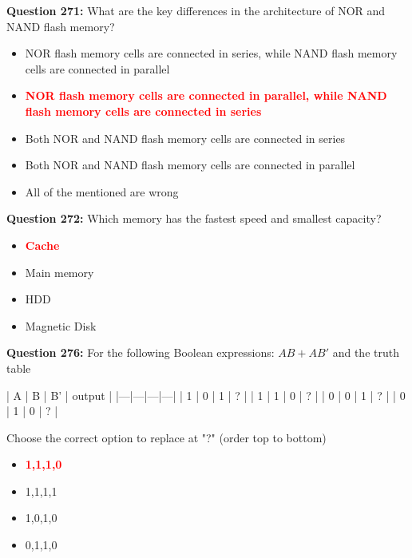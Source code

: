 \documentclass[12pt,a4paper]{article}
\begin{document}
\vspace{0.5cm}

\textbf{Question 271:} What are the key differences in the architecture of NOR and NAND flash memory?

\begin{itemize}
    \item[\textbf{A.}] NOR flash memory cells are connected in series, while NAND flash memory cells are connected in parallel
    \item[\textbf{B.}] \textcolor{red}{\textbf{NOR flash memory cells are connected in parallel, while NAND flash memory cells are connected in series}}
    \item[\textbf{C.}] Both NOR and NAND flash memory cells are connected in series
    \item[\textbf{D.}] Both NOR and NAND flash memory cells are connected in parallel
    \item[\textbf{E.}] All of the mentioned are wrong
\end{itemize}

\vspace{0.5cm}

\textbf{Question 272:} Which memory has the fastest speed and smallest capacity?

\begin{itemize}
    \item[\textbf{A.}] \textcolor{red}{\textbf{Cache}}
    \item[\textbf{B.}] Main memory
    \item[\textbf{C.}] HDD
    \item[\textbf{D.}] Magnetic Disk
\end{itemize}

\vspace{0.5cm}

\textbf{Question 276:} For the following Boolean expressions: $AB + AB'$ and the truth table

| A | B | B' | output |
|---|---|---|---|
| 1 | 0 | 1 | ? |
| 1 | 1 | 0 | ? |
| 0 | 0 | 1 | ? |
| 0 | 1 | 0 | ? |

Choose the correct option to replace at "?" (order top to bottom)

\begin{itemize}
    \item[\textbf{A.}] \textcolor{red}{\textbf{1,1,1,0}}
    \item[\textbf{B.}] 1,1,1,1
    \item[\textbf{C.}] 1,0,1,0
    \item[\textbf{D.}] 0,1,1,0
\end{itemize}
\end{document}
